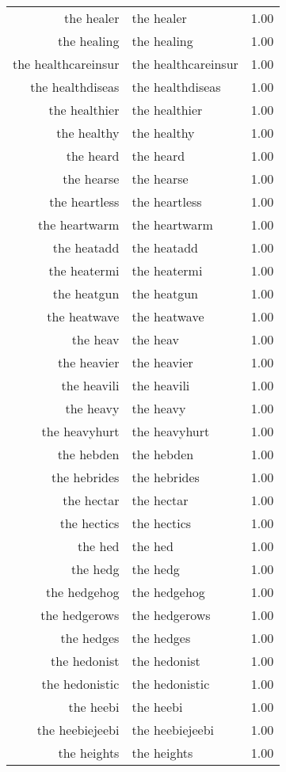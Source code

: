 \begin{table}[ht]
\begin{tabular}{rlr}
  the healer & the healer & 1.00 \\ 
  the healing & the healing & 1.00 \\ 
  the healthcareinsur & the healthcareinsur & 1.00 \\ 
  the healthdiseas & the healthdiseas & 1.00 \\ 
  the healthier & the healthier & 1.00 \\ 
  the healthy & the healthy & 1.00 \\ 
  the heard & the heard & 1.00 \\ 
  the hearse & the hearse & 1.00 \\ 
  the heartless & the heartless & 1.00 \\ 
  the heartwarm & the heartwarm & 1.00 \\ 
  the heatadd & the heatadd & 1.00 \\ 
  the heatermi & the heatermi & 1.00 \\ 
  the heatgun & the heatgun & 1.00 \\ 
  the heatwave & the heatwave & 1.00 \\ 
  the heav & the heav & 1.00 \\ 
  the heavier & the heavier & 1.00 \\ 
  the heavili & the heavili & 1.00 \\ 
  the heavy & the heavy & 1.00 \\ 
  the heavyhurt & the heavyhurt & 1.00 \\ 
  the hebden & the hebden & 1.00 \\ 
  the hebrides & the hebrides & 1.00 \\ 
  the hectar & the hectar & 1.00 \\ 
  the hectics & the hectics & 1.00 \\ 
  the hed & the hed & 1.00 \\ 
  the hedg & the hedg & 1.00 \\ 
  the hedgehog & the hedgehog & 1.00 \\ 
  the hedgerows & the hedgerows & 1.00 \\ 
  the hedges & the hedges & 1.00 \\ 
  the hedonist & the hedonist & 1.00 \\ 
  the hedonistic & the hedonistic & 1.00 \\ 
  the heebi & the heebi & 1.00 \\ 
  the heebiejeebi & the heebiejeebi & 1.00 \\ 
  the heights & the heights & 1.00 \\ 

\end{tabular}
\end{table}
